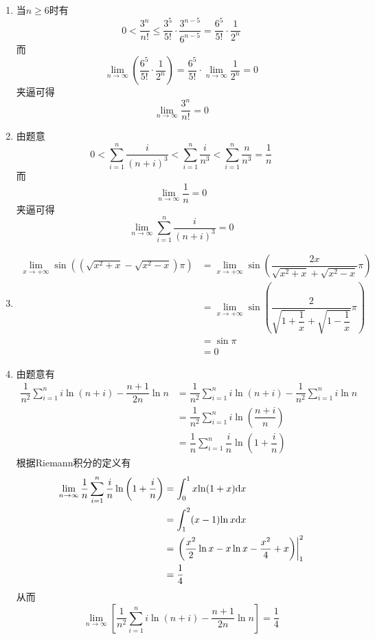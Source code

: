 \documentclass{ctexart}
\begin{document}
\begin{solution}
    \begin{enumerate}[leftmargin=*,label=\textbf{(\arabic*)}]
        \item 当$n\geqslant6$时有
            $$0<\dfrac{3^n}{n!}\leqslant\dfrac{3^5}{5!}\cdot\dfrac{3^{n-5}}{6^{n-5}}=\dfrac{6^5}{5!}\cdot\dfrac{1}{2^n}$$
            而$$\lim_{n\to\infty}\left(\dfrac{6^5}{5!}\cdot\dfrac{1}{2^n}\right)=\dfrac{6^5}{5!}\cdot\lim_{n\to\infty}\dfrac{1}{2^n}=0$$
            夹逼可得$$\lim_{n\to\infty}{\dfrac{3^n}{n!}}=0$$
        \item 由题意$$0<\sum_{i=1}^{n}{\dfrac{i}{(n+i)^3}}<\sum_{i=1}^{n}{\dfrac{i}{n^3}}<\sum_{i=1}^{n}{\dfrac{n}{n^3}}=\dfrac{1}{n}$$
            而$$\lim_{n\to\infty}{\dfrac{1}{n}}=0$$
            夹逼可得$$\lim_{n\to\infty}{\sum_{i=1}^{n}{\dfrac{i}{(n+i)^3}}}=0$$
        \item 
            $$\begin{aligned}
                \lim_{x\to+\infty}{\sin\left(\left(\sqrt{x^2+x}-\sqrt{x^2-x}\right)\pi\right)}
                &= \lim_{x\to+\infty}{\sin\left(\dfrac{2x}{\sqrt{x^2+x}+\sqrt{x^2-x}}\pi\right)} \\
                &= \lim_{x\to+\infty}{\sin\left(\dfrac{2}{\sqrt{1+\dfrac{1}{x}}+\sqrt{1-\dfrac{1}{x}}}\pi\right)} \\
                &= \sin\pi \\
                &= 0
            \end{aligned}$$
        \item 由题意有
            $$\begin{aligned}
                \dfrac{1}{n^2}\sum_{i=1}^{n}i\ln(n+i)-\dfrac{n+1}{2n}\ln{n}
                &= \dfrac{1}{n^2}\sum_{i=1}^{n}i\ln(n+i)-\dfrac{1}{n^2}\sum_{i=1}^{n}i\ln{n} \\
                &= \dfrac{1}{n^2}\sum_{i=1}^{n}{i\ln{\left(\dfrac{n+i}{n}\right)}} \\
                &= \dfrac{1}{n}\sum_{i=1}^{n}{\dfrac{i}{n}\ln\left(1+\dfrac{i}{n}\right)}
            \end{aligned}$$
            根据Riemann积分的定义有
            $$\begin{aligned}
                \lim_{n\to\infty}{\dfrac{1}{n}\sum_{i=1}^{n}{\dfrac{i}{n}\ln\left(1+\dfrac{i}{n}\right)}}
                &= \int_0^1x{\ln(1+x)\mathrm{d} x} \\
                &= \int_1^2(x-1){\ln x\mathrm{d} x} \\
                &= \left.\left(\dfrac{x^2}{2}\ln x-x\ln x-\dfrac{x^2}{4}+x\right)\right|_1^2 \\
                &= \dfrac{1}{4}
            \end{aligned}$$
            从而$$\lim_{n\to\infty}\left[\dfrac{1}{n^2}\sum_{i=1}^{n}i\ln(n+i)-\dfrac{n+1}{2n}\ln{n}\right]=\dfrac{1}{4}$$
    \end{enumerate}
\end{solution}
\end{document}
